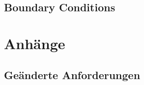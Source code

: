\documentclass[12pt]{article} %
\begin{document}
\subsection{Boundary Conditions}
{\color{red}{Oliver}}




\section{Anhänge}

\subsection{Geänderte Anforderungen}


\end{document}
